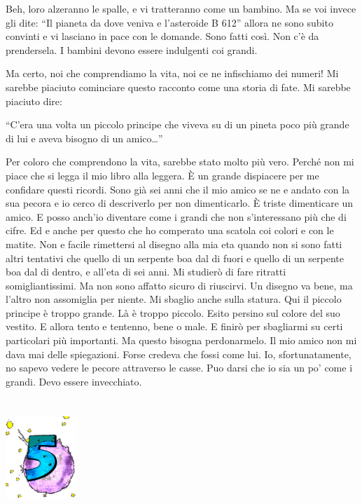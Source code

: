 \documentclass[11pt]{scrbook}
\begin{document}
Beh, loro alzeranno le spalle, e vi tratteranno come un bambino. Ma se
voi invece gli dite: ``Il pianeta da dove veniva e l'asteroide B 612''
allora ne sono subito convinti e vi lasciano in pace con le domande.
Sono fatti così. Non c'è da prendersela. I bambini devono essere
indulgenti coi grandi.

Ma certo, noi che comprendiamo la vita, noi ce ne infischiamo dei
numeri! Mi sarebbe piaciuto cominciare questo racconto come una storia
di fate. Mi sarebbe piaciuto dire:

``C'era una volta un piccolo principe che viveva su di un pineta poco
più grande di lui e aveva bisogno di un amico\ldots{}''

Per coloro che comprendono la vita, sarebbe stato molto più vero. Perché
non mi piace che si legga il mio libro alla leggera. È un grande
dispiacere per me confidare questi ricordi. Sono già sei anni che il mio
amico se ne e andato con la sua pecora e io cerco di descriverlo per non
dimenticarlo. È triste dimenticare un amico. E posso anch'io diventare
come i grandi che non s'interessano più che di cifre. Ed e anche per
questo che ho comperato una scatola coi colori e con le matite. Non e
facile rimettersi al disegno alla mia eta quando non si sono fatti altri
tentativi che quello di un serpente boa dal di fuori e quello di un
serpente boa dal di dentro, e all'eta di sei anni. Mi studierò di fare
ritratti somigliantissimi. Ma non sono affatto sicuro di riuscirvi. Un
disegno va bene, ma l'altro non assomiglia per niente. Mi sbaglio anche
sulla statura. Qui il piccolo principe è troppo grande. Là è troppo
piccolo. Esito persino sul colore del suo vestito. E allora tento e
tentenno, bene o male. E finirò per sbagliarmi su certi particolari più
importanti. Ma questo bisogna perdonarmelo. Il mio amico non mi dava mai
delle spiegazioni. Forse credeva che fossi come lui. Io,
sfortunatamente, no sapevo vedere le pecore attraverso le casse. Puo
darsi che io sia un po' come i grandi. Devo essere invecchiato.

\chapter{}
\begin{center}
\includegraphics{img/chapter5}
\end{center}
\end{document}
